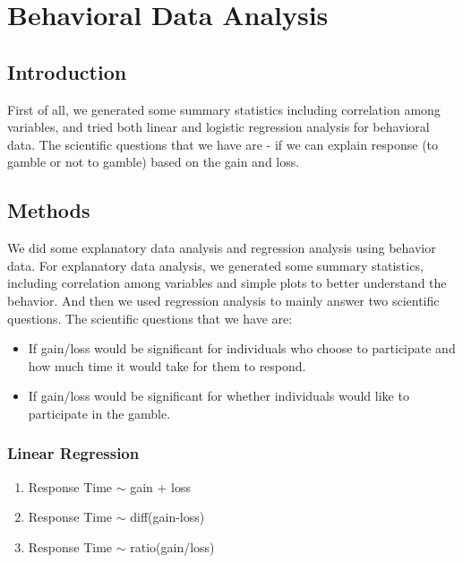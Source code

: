 \section{Behavioral Data Analysis}

\subsection{Introduction}
\noindent
First of all, we generated some summary statistics including correlation among variables, 
and tried both linear and logistic regression analysis for behavioral data. The scientific 
questions that we have are - if we can explain response (to gamble or not 
to gamble) based on the gain and loss.

\subsection{Methods}
\noindent
We did some explanatory data analysis and regression analysis using behavior 
data. For explanatory data analysis, we generated some summary statistics, 
including correlation among variables and simple plots to better understand 
the behavior. And then we used regression analysis to mainly answer two 
scientific questions. The scientific questions that we have are:
\begin{itemize}
\item If gain/loss would be significant for individuals who choose to 
participate and how much time it would take for them to respond.
\item If gain/loss would be significant for whether individuals would like to 
participate in the gamble. 
\end {itemize}

\subsubsection {Linear Regression}

\begin{enumerate}
\item  Response Time $\sim$ gain + loss
\item  Response Time $\sim$ diff(gain-loss)
\item  Response Time $\sim$ ratio(gain/loss)
\end {enumerate}

